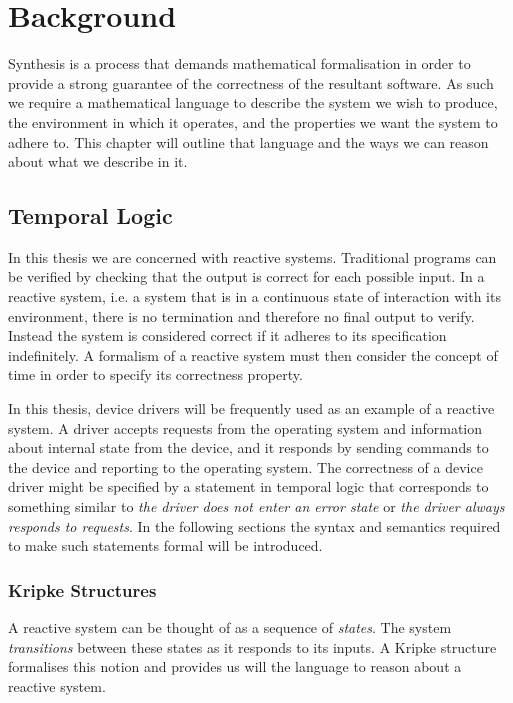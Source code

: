 \chapter{Background}
\label{ch:background}

Synthesis is a process that demands mathematical formalisation in order to
provide a strong guarantee of the correctness of the resultant software. As
such we require a mathematical language to describe the system we wish to
produce, the environment in which it operates, and the properties we want the
system to adhere to. This chapter will outline that language and the ways we
can reason about what we describe in it.

\section{Temporal Logic}

In this thesis we are concerned with reactive systems. Traditional programs can be verified by checking that the output is correct for each possible input. In a reactive system, i.e. a system that is in a continuous state of interaction with its environment, there is no termination and therefore no final output to verify. Instead the system is considered correct if it adheres to its specification indefinitely. A formalism of a reactive system must then consider the concept of time in order to specify its correctness property. 

In this thesis, device drivers will be frequently used as an example of a reactive system. A driver accepts requests from the operating system and information about internal state from the device, and it responds by sending commands to the device and reporting to the operating system. The correctness of a device driver might be specified by a statement in temporal logic that corresponds to something similar to \emph{the driver does not enter an error state} or \emph{the driver always responds to requests}. In the following sections the syntax and semantics required to make such statements formal will be introduced.

\subsection{Kripke Structures}

A reactive system can be thought of as a sequence of \emph{states}. The system
\emph{transitions} between these states as it responds to its inputs. A Kripke
structure~\cite{Kripke63} formalises this notion and provides us will the
language to reason about a reactive system.

